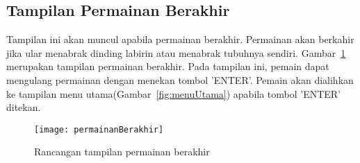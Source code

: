 \subsection{Tampilan Permainan Berakhir}
Tampilan ini akan muncul apabila permainan berakhir. Permainan akan berkahir jika ular menabrak dinding labirin atau menabrak tubuhnya sendiri. Gambar~\ref{fig:permainanBerakhir} merupakan tampilan permainan berakhir. Pada tampilan ini, pemain dapat mengulang permainan dengan menekan tombol 'ENTER'. Pemain akan dialihkan ke tampilan menu utama(Gambar~\ref{fig:menuUtama}) apabila tombol 'ENTER' ditekan.


\begin{figure}[H]
	\centering  
	\texttt{[image: permainanBerakhir]}  
	\caption[Rancangan tampilan permainan berakhir]{Rancangan tampilan permainan berakhir}
	\label{fig:permainanBerakhir} 
\end{figure}